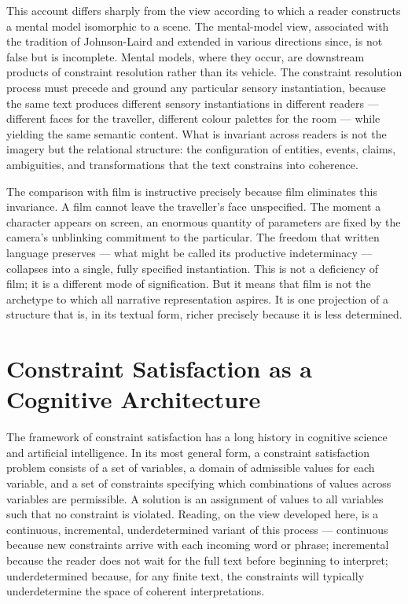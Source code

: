 \documentclass[12pt, a4paper]{article}
\begin{document}
This account differs sharply from the view according to which a reader constructs a mental model isomorphic to a scene. The mental-model view, associated with the tradition of Johnson-Laird and extended in various directions since, is not false but is incomplete. Mental models, where they occur, are downstream products of constraint resolution rather than its vehicle. The constraint resolution process must precede and ground any particular sensory instantiation, because the same text produces different sensory instantiations in different readers — different faces for the traveller, different colour palettes for the room — while yielding the same semantic content. What is invariant across readers is not the imagery but the relational structure: the configuration of entities, events, claims, ambiguities, and transformations that the text constrains into coherence.

The comparison with film is instructive precisely because film eliminates this invariance. A film cannot leave the traveller's face unspecified. The moment a character appears on screen, an enormous quantity of parameters are fixed by the camera's unblinking commitment to the particular. The freedom that written language preserves — what might be called its productive indeterminacy — collapses into a single, fully specified instantiation. This is not a deficiency of film; it is a different mode of signification. But it means that film is not the archetype to which all narrative representation aspires. It is one projection of a structure that is, in its textual form, richer precisely because it is less determined.

\section{Constraint Satisfaction as a Cognitive Architecture}

The framework of constraint satisfaction has a long history in cognitive science and artificial intelligence. In its most general form, a constraint satisfaction problem consists of a set of variables, a domain of admissible values for each variable, and a set of constraints specifying which combinations of values across variables are permissible. A solution is an assignment of values to all variables such that no constraint is violated. Reading, on the view developed here, is a continuous, incremental, underdetermined variant of this process — continuous because new constraints arrive with each incoming word or phrase; incremental because the reader does not wait for the full text before beginning to interpret; underdetermined because, for any finite text, the constraints will typically underdetermine the space of coherent interpretations.
\end{document}
